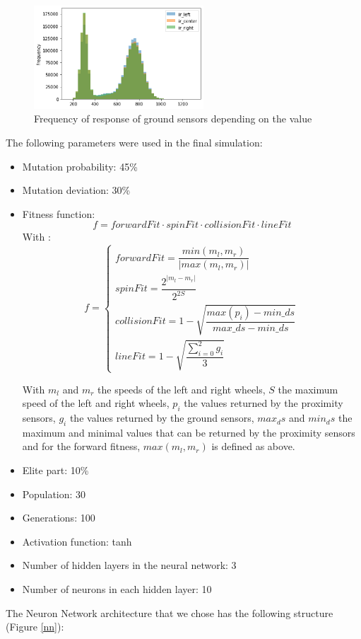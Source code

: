 \documentclass[lettersize,journal]{IEEEtran}
\begin{document}
\begin{figure}[H]
\centering
\includegraphics[width=2.5in]{irSensors.png}
\caption{Frequency of response of ground sensors depending on the value}
\label{groundSensors}
\end{figure}

The following parameters were used in the final simulation:
\begin{itemize}
    \item Mutation probability: 45\%
    \item Mutation deviation: 30\%
    \item Fitness function:
        \begin{equation}
    \label{finalFitness}
    f = forwardFit \cdot spinFit \cdot collisionFit \cdot lineFit
    \end{equation}
    With :
       \begin{equation*}
       f = \begin{cases} forwardFit = \dfrac{min(m_l,m_r)}{|max(m_l,m_r)|}
 \\[1em] spinFit = \dfrac{2^{|m_l-m_r|}}{2^{2S}} \\[1em] collisionFit = 1 - \sqrt{\dfrac{max(p_i)-min\_ds}{max\_ds - min\_ds}} \\[1em] lineFit = 1- \sqrt{\dfrac{\sum_{i=0}^{2} g_i}{3}}
        \end{cases}
        \end{equation*}
    
    With $m_l$ and $m_r$ the speeds of the left and right wheels, $S$ the maximum speed of the left and right wheels, $p_i$ the values returned by the proximity sensors, $g_i$ the values returned by the ground sensors, $max_ds$ and $min_ds$ the maximum and minimal values that can be returned by the proximity sensors and for the forward fitness, $max(m_l,m_r)$ is defined as above.

    \item Elite part: 10\%
    \item Population: 30
    \item Generations: 100
    \item Activation function: tanh
    \item Number of hidden layers in the neural network: 3
    \item Number of neurons in each hidden layer: 10
\end{itemize}
The Neuron Network architecture that we chose has the following structure (Figure \ref{nn}):
\end{document}
